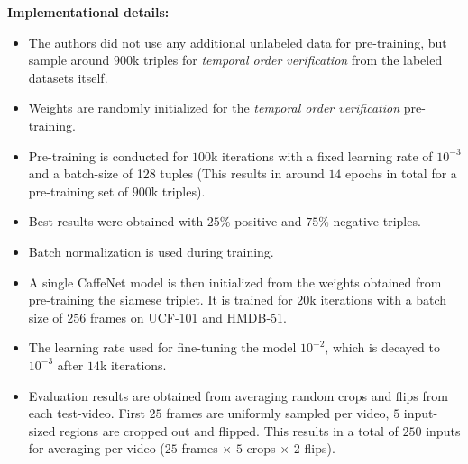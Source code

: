 \textbf{Implementational details:}\\
\begin{itemize}
    \item The authors did not use any additional unlabeled data for pre-training, but sample around $900$k triples for \textit{temporal order verification} from the labeled datasets itself.
    \item Weights are randomly initialized for the \textit{temporal order verification} pre-training. 
    \item Pre-training is conducted for $100$k iterations with a fixed learning rate of $10^{-3}$ and a batch-size of 128 tuples (This results in around $14$ epochs in total for a pre-training set of $900$k triples).
    \item Best results were obtained with $25\%$ positive and $75\%$ negative triples.
    \item Batch normalization \cite{ioffe_batch_2017} is used during training.
    \item A single CaffeNet model is then initialized from the weights obtained from pre-training the siamese triplet. It is trained for $20$k iterations with a batch size of $256$ frames on UCF-101 and HMDB-51.
    \item The learning rate used for fine-tuning the model $10^{-2}$, which is decayed to $10^{-3}$ after $14$k iterations.
    \item Evaluation results are obtained from averaging random crops and flips from each test-video. First $25$ frames are uniformly sampled per video, $5$ input-sized regions are cropped out and flipped. This results in a total of $250$ inputs for averaging per video ($25$ frames $\times$ $5$ crops $\times$ $2$ flips).
\end{itemize}
